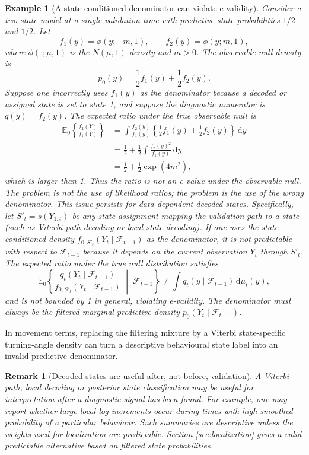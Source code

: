 \documentclass[pdflatex,sn-basic]{sn-jnl}
\theoremstyle{thmstyleone}
\theoremstyle{thmstyletwo}
\newtheorem{example}{Example}
\newtheorem{remark}{Remark}
\theoremstyle{thmstylethree}
\newcommand{\E}{\mathbb E}
\newcommand{\1}{\mathbf 1}
\newcommand{\calF}{\mathcal F}
\newcommand{\dd}{\,\mathrm d}
\begin{document}
\begin{example}[A state-conditioned denominator can violate e-validity]
\label{ex:decoded_invalid}
Consider a two-state model at a single validation time with predictive state probabilities $1/2$ and $1/2$. Let
\[
 f_1(y)=\phi(y;-m,1),\qquad f_2(y)=\phi(y;m,1),
\]
where $\phi(\cdot;\mu,1)$ is the $N(\mu,1)$ density and $m>0$. The observable null density is
\[
 p_0(y)=\frac12 f_1(y)+\frac12 f_2(y).
\]
Suppose one incorrectly uses $f_1(y)$ as the denominator because a decoded or assigned state is set to state 1, and suppose the diagnostic numerator is $q(y)=f_2(y)$. The expected ratio under the true observable null is
\begin{align}
 \E_0\left\{\frac{f_2(Y)}{f_1(Y)}\right\}
 &=\int \frac{f_2(y)}{f_1(y)}\left\{\frac12f_1(y)+\frac12f_2(y)\right\}\dd y\\
 &=\frac12+\frac12\int\frac{f_2(y)^2}{f_1(y)}\dd y\\
 &=\frac12+\frac12\exp(4m^2),
\end{align}
which is larger than 1. Thus the ratio is not an e-value under the observable null. The problem is not the use of likelihood ratios; the problem is the use of the wrong denominator. This issue persists for data-dependent decoded states. Specifically, let $S'_t = s(Y_{1:t})$ be any state assignment mapping the validation path to a state (such as Viterbi path decoding or local state decoding). If one uses the state-conditioned density $f_{0,S'_t}(Y_t \mid \calF_{t-1})$ as the denominator, it is not predictable with respect to $\calF_{t-1}$ because it depends on the current observation $Y_t$ through $S'_t$. The expected ratio under the true null distribution satisfies
\begin{equation}
 \E_0\left\{ \frac{q_t(Y_t\mid\calF_{t-1})}{f_{0,S'_t}(Y_t\mid\calF_{t-1})} \;\middle|\; \calF_{t-1} \right\} \neq \int q_t(y\mid\calF_{t-1})\dd\mu_t(y),
\end{equation}
and is not bounded by 1 in general, violating e-validity. The denominator must always be the filtered marginal predictive density $p_0(Y_t \mid \calF_{t-1})$.
\end{example}

In movement terms, replacing the filtering mixture by a Viterbi state-specific turning-angle density can turn a descriptive behavioural state label into an invalid predictive denominator.

\begin{remark}[Decoded states are useful after, not before, validation]
A Viterbi path, local decoding or posterior state classification may be useful for interpretation after a diagnostic signal has been found. For example, one may report whether large local log-increments occur during times with high smoothed probability of a particular behaviour. Such summaries are descriptive unless the weights used for localization are predictable. Section \ref{sec:localization} gives a valid predictable alternative based on filtered state probabilities.
\end{remark}
\end{document}
